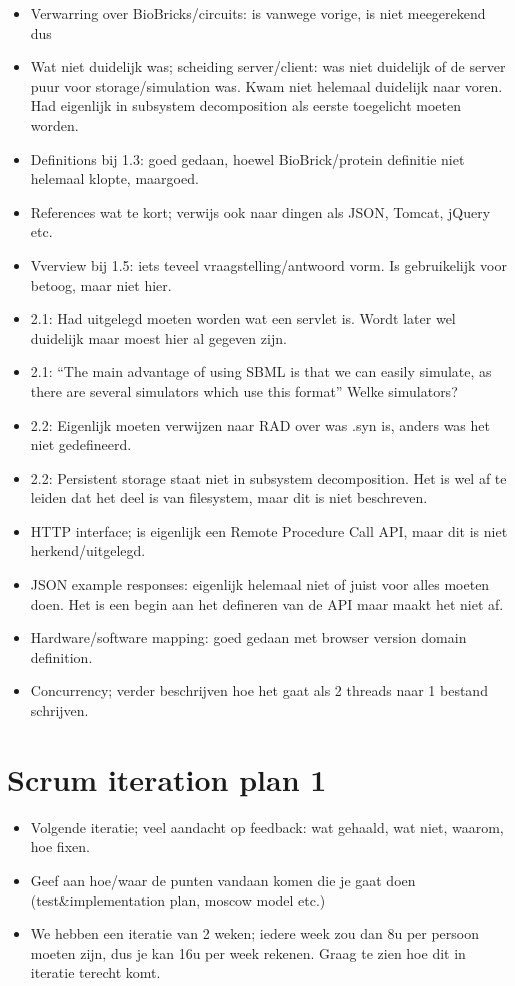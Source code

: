 \documentclass{article}
\begin{document}
\begin{itemize}
\item Verwarring over BioBricks/circuits: is vanwege vorige, is niet meegerekend dus
\item Wat niet duidelijk was; scheiding server/client: was niet duidelijk of de server puur voor storage/simulation was. Kwam niet helemaal duidelijk naar voren. Had eigenlijk in subsystem decomposition als eerste toegelicht moeten worden.
\item Definitions bij 1.3: goed gedaan, hoewel BioBrick/protein definitie niet helemaal klopte, maargoed.
\item References wat te kort; verwijs ook naar dingen als JSON, Tomcat, jQuery etc.
\item Vverview bij 1.5: iets teveel vraagstelling/antwoord vorm. Is gebruikelijk voor betoog, maar niet hier.
\item 2.1: Had uitgelegd moeten worden wat een servlet is. Wordt later wel duidelijk maar moest hier al gegeven zijn.
\item 2.1: ``The main advantage of using SBML is that we can easily simulate, as there are several simulators which use this format'' Welke simulators?
\item 2.2: Eigenlijk moeten verwijzen naar RAD over was .syn is, anders was het niet gedefineerd.
\item 2.2: Persistent storage staat niet in subsystem decomposition. Het is wel af te leiden dat het deel is van filesystem, maar dit is niet beschreven.
\item HTTP interface; is eigenlijk een Remote Procedure Call API, maar dit is niet herkend/uitgelegd.
\item JSON example responses: eigenlijk helemaal niet of juist voor alles moeten doen. Het is een begin aan het defineren van de API maar maakt het niet af.
\item Hardware/software mapping: goed gedaan met browser version domain definition.
\item Concurrency; verder beschrijven hoe het gaat als 2 threads naar 1 bestand schrijven.
\end{itemize}

\section{Scrum iteration plan 1}
\begin{itemize}
\item Volgende iteratie; veel aandacht op feedback: wat gehaald, wat niet, waarom, hoe fixen.
\item Geef aan hoe/waar de punten vandaan komen die je gaat doen (test\&implementation plan, moscow model etc.)
\item We hebben een iteratie van 2 weken; iedere week zou dan 8u per persoon moeten zijn, dus je kan 16u per week rekenen. Graag te zien hoe dit in iteratie terecht komt.
\end{itemize}
\end{document}
